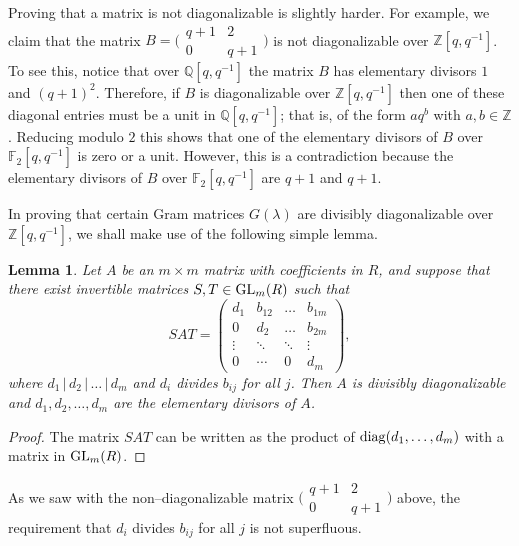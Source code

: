 \documentclass[twoside]{amsart}
\numberwithin{equation}{section}
\newtheorem{Lemma}[equation]{Lemma}
\theoremstyle{remark}
\def\diag{\mathop{\rm diag}\nolimits}
\def\GL{\mathop{\rm GL}\nolimits}
\def\F{{\mathbb F}}
\def\Z{{\mathbb Z}}
\def\Q{{\mathbb Q}}
\begin{document}
Proving that a matrix is not diagonalizable is slightly harder. For example, 
we claim that the matrix
$B = \big(\begin{smallmatrix} q+1 & 2 \\ 0 & q+1 \end{smallmatrix}\big)$
    is not diagonalizable over $\Z[q,q^{-1}]$. To see this, notice that over $\Q[q,q^{-1}]$
the matrix $B$ has elementary divisors $1$ and $(q+1)^2$. Therefore,
if $B$ is diagonalizable over $\Z[q,q^{-1}]$ then one of these
diagonal entries must be a unit in $\Q[q,q^{-1}]$; that is, of the
form $aq^b$ with $a,b\in\Z$.  Reducing modulo $2$ this shows that one
of the elementary divisors of $B$ over $\F_2[q,q^{-1}]$ is zero or a
unit. However, this is a contradiction because the elementary
divisors of $B$ over $\F_2[q,q^{-1}]$ are $q+1$ and $q+1$.

In proving that certain Gram matrices $G(\lambda)$ are  divisibly diagonalizable over 
$\Z[q,q^{-1}]$, we shall make use of the following simple lemma. 

\begin{Lemma}\label{diag}
Let $A$ be an $m\times m$ matrix with coefficients in $R$, 
and suppose that there exist invertible matrices $S,T\in\GL_m(R)$ such that 
$$
SAT = \left(\begin{matrix} d_1    & b_{12} & \dots  & b_{1m} \\
                           0      & d_2    & \dots  & b_{2m} \\
                           \vdots & \ddots & \ddots & \vdots\\
                           0      & \cdots & 0      & d_m
\end{matrix}\right),
$$
where $d_1\, |\, d_2\, |\, \dots\, |\, d_m$ and $d_i$ divides $b_{ij}$ for all $j$. Then
$A$ is divisibly diagonalizable and $d_1,d_2,\dots,d_m$ are the
elementary divisors of $A$.
\end{Lemma}

\begin{proof}
The matrix $SAT$ can be written as the product of $\diag(d_1,\dots,d_m)$ with a 
matrix in $\GL_m(R)$.
\end{proof}

As we saw with the non--diagonalizable matrix 
$\big(\begin{smallmatrix} q+1 & 2 \\ 0 & q+1 \end{smallmatrix}\big)$
above, the requirement that $d_i$ divides $b_{ij}$ for all $j$ is not
superfluous. 
\end{document}

